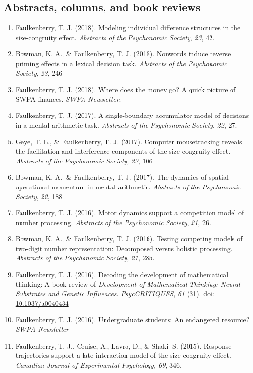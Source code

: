 \documentclass[article,10pt]{article}
\begin{document}
\subsection*{Abstracts, columns, and book reviews}
\label{sec:org8c4116a}
\begin{enumerate}
\item Faulkenberry, T. J. (2018). Modeling individual difference structures in the size-congruity effect. \emph{Abstracts of the Psychonomic Society}, \emph{23}, 42.
\item Bowman, K. A., \& Faulkenberry, T. J. (2018). Nonwords induce reverse priming effects in a lexical decision task. \emph{Abstracts of the Psychonomic Society}, \emph{23}, 246.
\item Faulkenberry, T. J. (2018). Where does the money go? A quick picture of SWPA finances. \emph{SWPA Newsletter}.
\item Faulkenberry, T. J. (2017). A single-boundary accumulator model of decisions in a mental arithmetic task. \emph{Abstracts of the Psychonomic Society}, \emph{22}, 27.
\item Geye, T. L., \& Faulkenberry, T. J. (2017). Computer mousetracking reveals the facilitation and interference components of the size congruity effect. \emph{Abstracts of the Psychonomic Society}, \emph{22}, 106.
\item Bowman, K. A., \& Faulkenberry, T. J. (2017). The dynamics of spatial-operational momentum in mental arithmetic. \emph{Abstracts of the Psychonomic Society}, \emph{22}, 188.
\item Faulkenberry, T. J. (2016). Motor dynamics support a competition model of number processing. \emph{Abstracts of the Psychonomic Society}, \emph{21}, 26.
\item Bowman, K. A., \& Faulkenberry, T. J. (2016). Testing competing models of two-digit number representation: Decomposed versus holistic processing. \emph{Abstracts of the Psychonomic Society}, \emph{21}, 285.
\item Faulkenberry, T. J. (2016). Decoding the development of mathematical thinking: A book review of \emph{Development of Mathematical Thinking: Neural Substrates and Genetic Influences}. \emph{PsycCRITIQUES}, \emph{61} (31). doi: \href{http://dx.doi.org/10.1037/a0040434}{10.1037/a0040434}
\item Faulkenberry, T. J. (2016). Undergraduate students: An endangered resource? \emph{SWPA Newsletter}
\item Faulkenberry, T. J., Cruise, A., Lavro, D., \& Shaki, S. (2015). Response trajectories support a late-interaction model of the size-congruity effect. \emph{Canadian Journal of Experimental Psychology, 69}, 346.

\end{enumerate}
\end{document}
